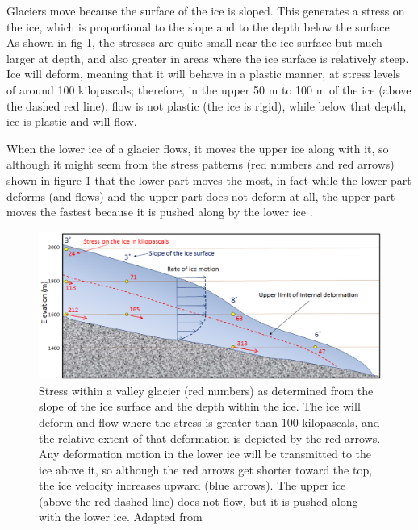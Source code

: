 \documentclass{article}
\begin{document}
Glaciers move because the surface of the ice is sloped. This generates a stress on the ice, which is proportional to the slope and to the depth below the surface \cite{earle2015physical}. As shown in fig \ref{Flow_ice}, the stresses are quite small near the ice surface but much larger at depth, and also greater in areas where the ice surface is relatively steep. Ice will deform, meaning that it will behave in a plastic manner, at stress levels of around 100 kilopascals; therefore, in the upper 50 m to 100 m of the ice (above the dashed red line), flow is not plastic (the ice is rigid), while below that depth, ice is plastic and will flow.

When the lower ice of a glacier flows, it moves the upper ice along with it, so although it might seem from the stress patterns (red numbers and red arrows) shown in figure \ref{Flow_ice} that the lower part moves the most, in fact while the lower part deforms (and flows) and the upper part does not deform at all, the upper part moves the fastest because it is pushed along by the lower ice \cite{earle2015physical}.

\begin{figure}[!h]
	\centering
	\includegraphics[width=0.7\linewidth]{../fig/ice_flow.png}
	\caption{Stress within a valley glacier (red numbers) as determined from the slope of the ice surface and the depth within the ice. The ice will deform and flow where the stress is greater than 100 kilopascals, and the relative extent of that deformation is depicted by the red arrows. Any deformation motion in the lower ice will be transmitted to the ice above it, so although the red arrows get shorter toward the top, the ice velocity increases upward (blue arrows). The upper ice (above the red dashed line) does not flow, but it is pushed along with the lower ice. Adapted from \cite{earle2015physical}}
	\label{Flow_ice}
\end{figure}
\end{document}
